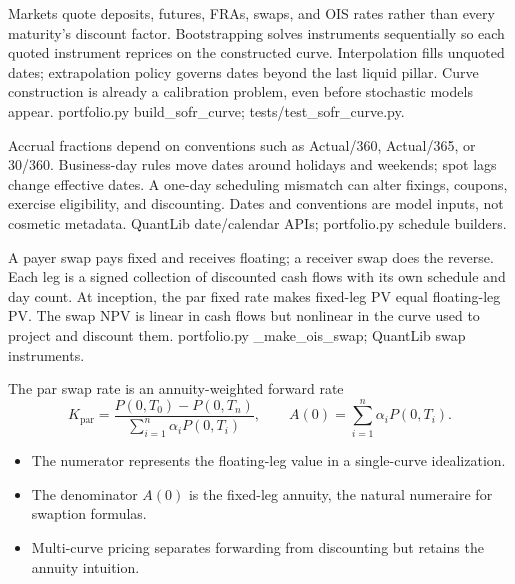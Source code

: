 {Markets quote deposits, futures, FRAs, swaps, and OIS rates rather than every maturity's discount factor.}
{Bootstrapping solves instruments sequentially so each quoted instrument reprices on the constructed curve.}
{Interpolation fills unquoted dates; extrapolation policy governs dates beyond the last liquid pillar.}
{Curve construction is already a calibration problem, even before stochastic models appear.}
{portfolio.py build\_sofr\_curve; tests/test\_sofr\_curve.py.}

{Accrual fractions depend on conventions such as Actual/360, Actual/365, or 30/360.}
{Business-day rules move dates around holidays and weekends; spot lags change effective dates.}
{A one-day scheduling mismatch can alter fixings, coupons, exercise eligibility, and discounting.}
{Dates and conventions are model inputs, not cosmetic metadata.}
{QuantLib date/calendar APIs; portfolio.py schedule builders.}

{A payer swap pays fixed and receives floating; a receiver swap does the reverse.}
{Each leg is a signed collection of discounted cash flows with its own schedule and day count.}
{At inception, the par fixed rate makes fixed-leg PV equal floating-leg PV.}
{The swap NPV is linear in cash flows but nonlinear in the curve used to project and discount them.}
{portfolio.py \_make\_ois\_swap; QuantLib swap instruments.}

\begin{frame}{The par swap rate is an annuity-weighted forward rate}
  \[
    K_{\mathrm{par}}=\frac{P(0,T_0)-P(0,T_n)}{\sum_{i=1}^{n}\alpha_iP(0,T_i)},
    \qquad
    A(0)=\sum_{i=1}^{n}\alpha_iP(0,T_i).
  \]
  \begin{itemize}\setlength\itemsep{0.9em}
    \item The numerator represents the floating-leg value in a single-curve idealization.
    \item The denominator $A(0)$ is the fixed-leg annuity, the natural numeraire for swaption formulas.
    \item Multi-curve pricing separates forwarding from discounting but retains the annuity intuition.
  \end{itemize}
\end{frame}

